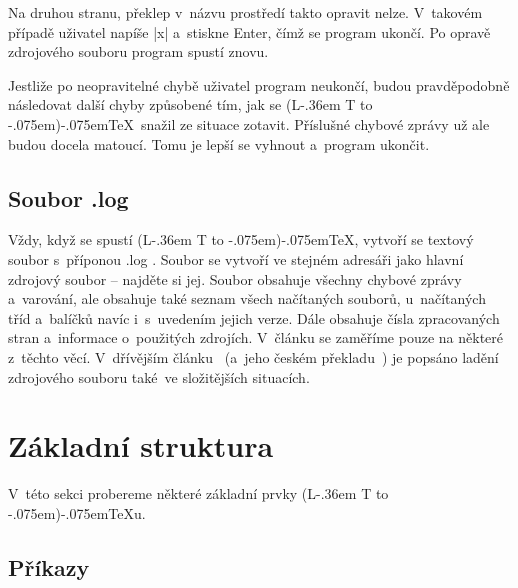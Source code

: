 \documentclass{csbulletin}
\makeatletter
\def\soub#1{{\sffamily
  \tmphc\hyphenchar\font
  \hyphenchar\font-1 #1%
  \hyphenchar\font\tmphc}}
\DeclareRobustCommand{\La}{L\kern-.36em%
        {\sbox\z@ T%
         \vbox to\ht\z@{\hbox{\check@mathfonts
                              \fontsize\sf@size\z@
                              \math@fontsfalse\selectfont
                              A}%
                        \vss}%
        }}
\def\AllTeX{(\La\kern-.075em)\kern-.075em\TeX}
\makeatother
\begin{document}
Na druhou stranu, překlep v~názvu prostředí takto opravit nelze. V~takovém případě uživatel napíše |x| a~stiskne Enter, čímž se program ukončí. Po opravě zdrojového souboru program spustí znovu.

Jestliže po neopravitelné chybě uživatel program neukončí, budou pravděpodobně následovat další chyby způsobené tím, jak se \AllTeX\ snažil ze situace zotavit. Příslušné chybové zprávy už ale budou docela matoucí. Tomu je lepší se vyhnout a~program ukončit.

\subsection{Soubor \soub{.log}}

Vždy, když se spustí \AllTeX, vytvoří se textový soubor s~příponou \soub{.log}. Soubor se vytvoří ve stejném adresáři jako hlavní zdrojový soubor -- najděte si jej. Soubor obsahuje všechny chybové zprávy a~varování, ale obsahuje také seznam všech načítaných souborů, u~načítaných tříd a~balíčků navíc i~s~uvedením jejich verze. Dále obsahuje čísla zpracovaných stran a~informace o~použitých zdrojích. V~článku se zaměříme pouze na některé z~těchto věcí. V~dřívějším článku~\cite{debug} (a~jeho českém překladu~\cite{debugCZ}) je popsáno ladění zdrojového souboru také~ve složitějších situacích.


%
%

\section{Základní struktura}

V~této sekci probereme některé základní prvky \AllTeX u.

\subsection{Příkazy}
\end{document}
